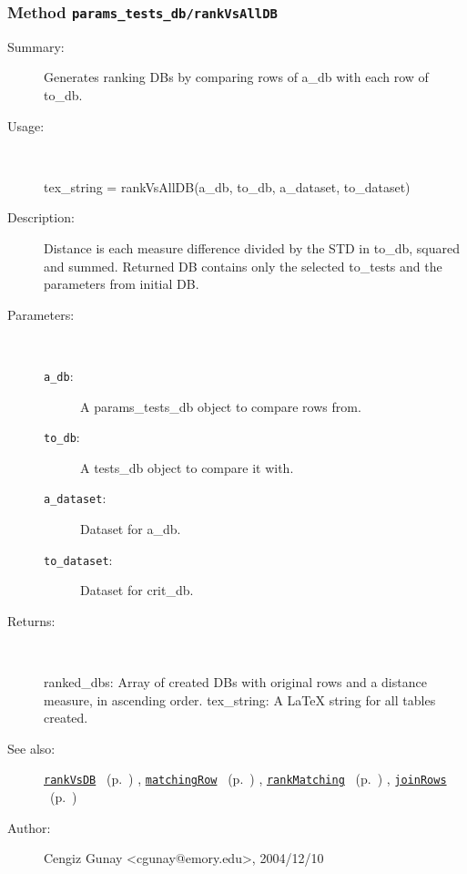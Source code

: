 \subsubsection[Method \texttt{rankVsAllDB}]{Method \texttt{params\_tests\_db/rankVsAllDB}}%
%
\label{ref_params_tests_db__rankVsAllDB}%
\hypertarget{ref_params_tests_db__rankVsAllDB}{}%
\begin{description}
\item[Summary:]Generates ranking DBs by comparing rows of a\_db with each row of to\_db.
%
\item[Usage:]~%
\begin{lyxcode}%
tex\_string = rankVsAllDB(a\_db, to\_db, a\_dataset, to\_dataset)
%
\end{lyxcode}%
%
\item[Description:]%
Distance is each measure difference divided by the STD in to\_db, squared and
 summed. Returned DB contains only the selected to\_tests and the parameters
 from initial DB.
\item[Parameters:]~
\begin{description}%
\item[\texttt{a\_db}:]
 A params\_tests\_db object to compare rows from.
\item[\texttt{to\_db}:]
 A tests\_db object to compare it with.
\item[\texttt{a\_dataset}:]
 Dataset for a\_db.
\item[\texttt{to\_dataset}:]
 Dataset for crit\_db.
\end{description}%
%
\item[Returns:]~

	ranked\_dbs: Array of created DBs with original rows and a distance 
		   measure, in ascending order. 
	tex\_string: A LaTeX string for all tables created.
%
%
\item[See also:]%
\hyperlink{ref_rankVsDB}{\texttt{rankVsDB}}%
\ (p.~\pageref{ref_rankVsDB})%
%
, \hyperlink{ref_matchingRow}{\texttt{matchingRow}}%
\ (p.~\pageref{ref_matchingRow})%
%
, \hyperlink{ref_rankMatching}{\texttt{rankMatching}}%
\ (p.~\pageref{ref_rankMatching})%
%
, \hyperlink{ref_joinRows}{\texttt{joinRows}}%
\ (p.~\pageref{ref_joinRows})%
%
%
\item[Author:]%
Cengiz Gunay <cgunay@emory.edu>, 2004/12/10%
\end{description}
\methodline%
